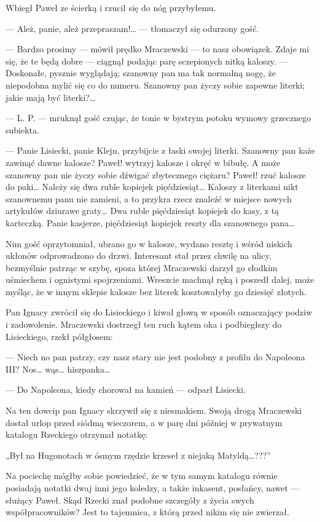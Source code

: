 \documentclass{book}
\begin{document}
Wbiegł Paweł ze ścierką i rzucił się do nóg przybyłemu.

— Ależ, panie, ależ przepraszam!… — tłomaczył się odurzony gość.

— Bardzo prosimy — mówił prędko Mraczewski — to nasz obowiązek. Zdaje mi się, że te będą dobre — ciągnął podając parę sczepionych nitką kaloszy. — Doskonałe, pysznie wyglądają; szanowny pan ma tak normalną nogę, że niepodobna mylić się co do numeru. Szanowny pan życzy sobie zapewne literki; jakie mają być literki?…

— L. P. — mruknął gość czując, że tonie w bystrym potoku wymowy grzecznego subiekta.

— Panie Lisiecki, panie Klejn, przybijcie z łaski swojej literki. Szanowny pan każe zawinąć dawne kalosze? Paweł! wytrzyj kalosze i okręć w bibułę. A może szanowny pan nie życzy sobie dźwigać zbytecznego ciężaru? Paweł! rzuć kalosze do paki… Należy się dwa ruble kopiejek pięćdziesiąt… Kaloszy z literkami nikt szanownemu panu nie zamieni, a to przykra rzecz znaleźć w miejsce nowych artykułów dziurawe graty… Dwa ruble pięćdziesiąt kopiejek do kasy, z tą karteczką. Panie kasjerze, pięćdziesiąt kopiejek reszty dla szanownego pana…

Nim gość oprzytomniał, ubrano go w kalosze, wydano resztę i wśród niskich ukłonów odprowadzono do drzwi. Interesant stał przez chwilę na ulicy, bezmyślnie patrząc w szybę, spoza której Mraczewski darzył go słodkim uśmiechem i ognistymi spojrzeniami. Wreszcie machnął ręką i poszedł dalej, może myśląc, że w innym sklepie kalosze bez literek kosztowałyby go dziesięć złotych.

Pan Ignacy zwrócił się do Lisieckiego i kiwał głową w sposób oznaczający podziw i zadowolenie. Mraczewski dostrzegł ten ruch kątem oka i podbiegłszy do Lisieckiego, rzekł półgłosem:

— Niech no pan patrzy, czy nasz stary nie jest podobny z profilu do Napoleona III? Nos… wąs… hiszpanka…

— Do Napoleona, kiedy chorował na kamień — odparł Lisiecki.

Na ten dowcip pan Ignacy skrzywił się z niesmakiem. Swoją drogą Mraczewski dostał urlop przed siódmą wieczorem, a w parę dni później w prywatnym katalogu Rzeckiego otrzymał notatkę:

„Był na Hugonotach w ósmym rzędzie krzeseł z niejaką Matyldą…???”

Na pociechę mógłby sobie powiedzieć, że w tym samym katalogu równie posiadają notatki dwaj inni jego koledzy, a także inkasent, posłańcy, nawet — służący Paweł. Skąd Rzecki znał podobne szczegóły z życia swych współpracowników? Jest to tajemnica, z którą przed nikim się nie zwierzał.
\end{document}
